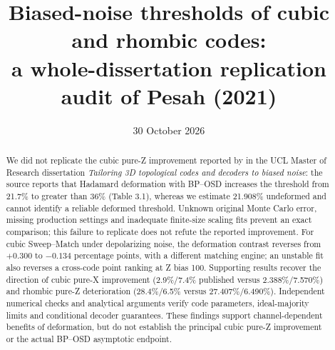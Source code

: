 
\newcommand{\repo}[2]{\href{https://github.com/alectionary/vibe-math/blob/master/formalization/pesah-biased-cubic/#1}{\nolinkurl{#2}}}
\title{Biased-noise thresholds of cubic and rhombic codes:\\a whole-dissertation replication audit of Pesah (2021)}
\author{}
\date{30 October 2026}

\maketitle
\begin{abstract}
We did not replicate the cubic pure-Z improvement reported by \citet{pesah2021} in the UCL Master of Research dissertation \emph{Tailoring 3D topological codes and decoders to biased noise}: the source reports that Hadamard deformation with BP--OSD increases the threshold from 21.7\% to greater than 36\% (Table 3.1), whereas we estimate 21.908\% undeformed and cannot identify a reliable deformed threshold. Unknown original Monte Carlo error, missing production settings and inadequate finite-size scaling fits prevent an exact comparison; this failure to replicate does not refute the reported improvement. For cubic Sweep--Match under depolarizing noise, the deformation contrast reverses from $+0.300$ to $-0.134$ percentage points, with a different matching engine; an unstable fit also reverses a cross-code point ranking at Z bias 100. Supporting results recover the direction of cubic pure-X improvement (2.9\%/7.4\% published versus 2.388\%/7.570\%) and rhombic pure-Z deterioration (28.4\%/6.5\% versus 27.407\%/6.490\%). Independent numerical checks and analytical arguments verify code parameters, ideal-majority limits and conditional decoder guarantees. These findings support channel-dependent benefits of deformation, but do not establish the principal cubic pure-Z improvement or the actual BP--OSD asymptotic endpoint.
\end{abstract}

